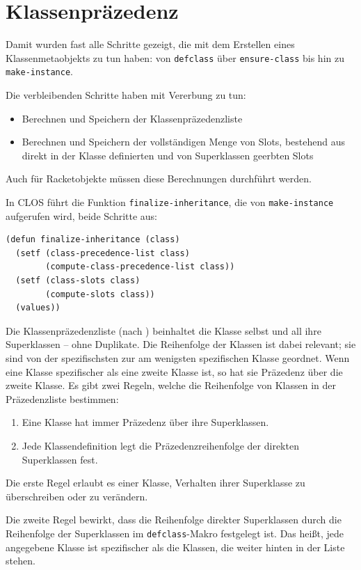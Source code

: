\section{Klassenpräzedenz}
\label{cpl}
Damit wurden fast alle Schritte gezeigt, die mit dem Erstellen eines Klassenmetaobjekts zu tun haben: von \texttt{defclass} über \texttt{ensure-class} bis hin zu \texttt{make-instance}. 

Die verbleibenden Schritte haben mit Vererbung zu tun:
\begin{itemize}
 \item Berechnen und Speichern der Klassenpräzedenzliste
 \item Berechnen und Speichern der vollständigen Menge von Slots, bestehend aus direkt in der Klasse definierten und von Superklassen geerbten Slots
\end{itemize}

Auch für Racketobjekte müssen diese Berechnungen durchführt werden.

In CLOS führt die Funktion \texttt{finalize-inheritance}, die von \texttt{make-instance} aufgerufen wird, beide Schritte aus:

\begin{lstlisting}
(defun finalize-inheritance (class)
  (setf (class-precedence-list class)
        (compute-class-precedence-list class))
  (setf (class-slots class)
        (compute-slots class))
  (values))
\end{lstlisting}

Die Klassenpräzedenzliste (nach \cite[S. 118ff]{keene}) beinhaltet die Klasse selbst und all ihre Superklassen -- ohne Duplikate. Die Reihenfolge der Klassen ist dabei relevant; sie sind von der spezifischsten zur am wenigsten spezifischen Klasse geordnet. Wenn eine Klasse spezifischer als eine zweite Klasse ist, so hat sie Präzedenz über die zweite Klasse. Es gibt zwei Regeln, welche die Reihenfolge von Klassen in der Präzedenzliste bestimmen:

\begin{enumerate}
 \item Eine Klasse hat immer Präzedenz über ihre Superklassen.
 \item Jede Klassendefinition legt die Präzedenzreihenfolge der direkten Superklassen fest.
\end{enumerate}

Die erste Regel erlaubt es einer Klasse, Verhalten ihrer Superklasse zu überschreiben oder zu verändern.

Die zweite Regel bewirkt, dass die Reihenfolge direkter Superklassen durch die Reihenfolge der Superklassen im \texttt{defclass}-Makro festgelegt ist. Das heißt, jede angegebene Klasse ist spezifischer als die Klassen, die weiter hinten in der Liste stehen.

